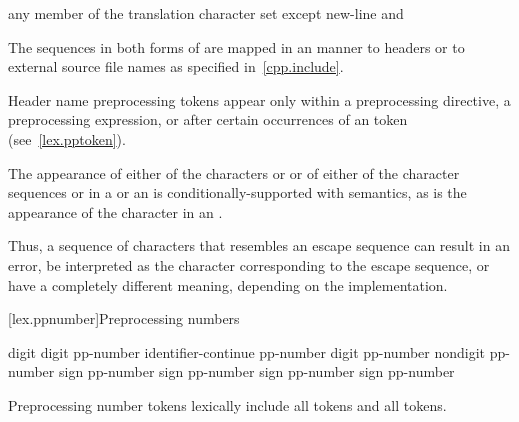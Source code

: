 \begin{bnf}
\br
    \textnormal{any member of the translation character set except new-line and }
\end{bnf}

\pnum
The sequences in both forms of  are mapped in an
 manner to headers or to
external source file names as specified in~\ref{cpp.include}.
\begin{note}
Header name preprocessing tokens appear only within
a  preprocessing directive,
a  preprocessing expression, or
after certain occurrences of an  token
(see~\ref{lex.pptoken}).
\end{note}

\pnum
The appearance of either of the characters  or \tcode{\textbackslash} or of
either of the character sequences \tcode{/*} or \tcode{//} in a
 or an 
is conditionally-supported with  semantics, as is the appearance of the character
 in an .
\begin{note}
Thus, a sequence of characters
that resembles an escape sequence can result in an error, be interpreted as the
character corresponding to the escape sequence, or have a completely different meaning,
depending on the implementation.
\end{note}

[lex.ppnumber]{Preprocessing numbers}

%
\begin{bnf}
\br
    digit\br
     digit\br
    pp-number identifier-continue\br
    pp-number  digit\br
    pp-number  nondigit\br
    pp-number  sign\br
    pp-number  sign\br
    pp-number  sign\br
    pp-number  sign\br
    pp-number 
\end{bnf}

\pnum
Preprocessing number tokens lexically include
all  tokens and
all  tokens.

